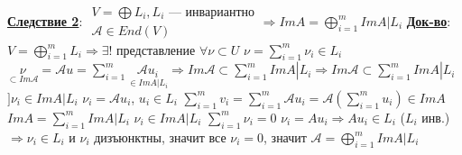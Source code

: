 \documentclass[12pt,a4paper]{article}
\newcommand{\bfline}[1]{\textbf{\underline{#1}}}
\begin{document}
\bfline{Следствие 2}: \newline
$
\begin{array}{r}
V = \bigoplus L_i, L_i\text{ --- инвариантно} \\
\mathcal{A} \in End(V)
\end{array} \Rightarrow Im A = \bigoplus\limits_{i=1}^{m} Im A|L_i
$ \newline
\bfline{Док-во}: \newline
$V = \bigoplus\limits_{i=1}^{m} L_i \Rightarrow \exists !$ представление $\forall \nu \subset U$ $\nu = \sum\limits_{i=1}^{m} \nu_i \in L_i$ \newline
$\underset{\subset Im \mathcal{A}}{\nu} = \mathcal{A}u = \sum\limits_{i=1}^{m} \underset{\in Im A|L_i}{\mathcal{A} u_i} \Rightarrow Im \mathcal{A} \subset \sum\limits_{i=1}^{m} Im A|L_i \Rightarrow Im \mathcal{A} \subset \sum\limits_{i=1}^{m} Im A|L_i$ \newline
$] \nu_i \in Im A|L_i$ $\nu_i = \mathcal{A} u_i$, $u_i \in L_i$ \newline
$\sum\limits_{i=1}^{m} v_i = \sum\limits_{i=1}^{m} \mathcal{A} u_i = \mathcal{A} \left( \sum\limits_{i=1}^{m} u_i \right) \in Im A$ \newline
$Im A = \sum\limits_{i=1}^{m} Im A|L_i$ \newline
$\nu_i \in Im A|L_i$ $\sum\limits_{i=1}^{m} \nu_i = 0$ \newline
$\nu_i = A u_i \Rightarrow A u_i \in L_i$ ($L_i$ инв.) $\Rightarrow \nu_i \in L_i$ и $\nu_i$ дизъюнктны, значит все $\nu_i=0$, значит $\mathcal{A}=\bigoplus\limits_{i=1}^{m} Im A|L_i$ 
\end{document}
